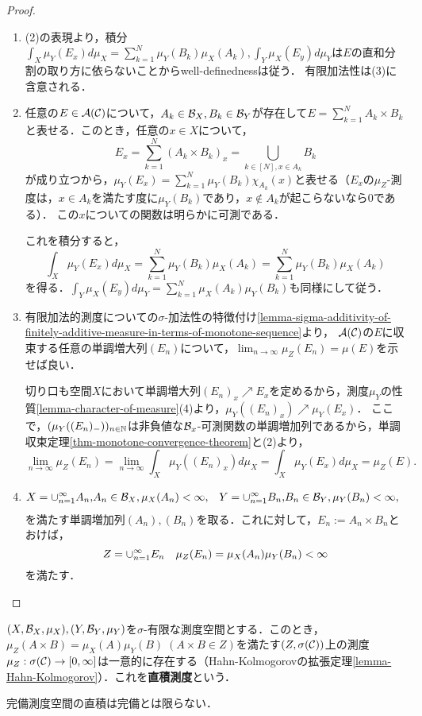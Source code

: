 \documentclass[uplatex, dvipdfmx]{jsreport}
\begin{document}
\begin{proof}\mbox{}
    \begin{enumerate}
        \item (2)の表現より，積分$\int_X\mu_Y(E_x)d\mu_X=\sum_{k=1}^N\mu_Y(B_k)\mu_X(A_k),\int_Y\mu_X(E_y)d\mu_Y$は$E$の直和分割の取り方に依らないことからwell-definednessは従う．
        有限加法性は(3)に含意される．
        \item 任意の$E\in\mathcal{A}(\mathcal{C})$について，$A_k\in\mathcal{B}_X,B_k\in\mathcal{B}_Y$が存在して$E=\sum_{k=1}^NA_k\times B_k$と表せる．このとき，任意の$x\in X$について，
        \[E_x=\sum^N_{k=1}(A_k\times B_k)_x=\bigcup_{k\in[N],x\in A_k}B_k\]
        が成り立つから，$\mu_Y(E_x)=\sum_{k=1}^N\mu_Y(B_k)\chi_{A_k}(x)$と表せる（$E_x$の$\mu_Z$-測度は，$x\in A_k$を満たす度に$\mu_Y(B_k)$であり，$x\notin A_k$が起こらないなら$0$である）．
        この$x$についての関数は明らかに可測である．

        これを積分すると，
        \[\int_X\mu_Y(E_x)d\mu_X=\sum_{k=1}^N\mu_Y(B_k)\mu_X(A_k)=\sum_{k=1}^N\mu_Y(B_k)\mu_X(A_k)\]
        を得る．$\int_Y\mu_X(E_y)d\mu_Y=\sum_{k=1}^N\mu_X(A_k)\mu_Y(B_k)$も同様にして従う．
        \item 
        有限加法的測度についての$\sigma$-加法性の特徴付け\ref{lemma-sigma-additivity-of-finitely-additive-measure-in-terms-of-monotone-sequence}より，
        $\mathcal{A}(\mathcal{C})$の$E$に収束する任意の単調増大列$(E_n)$について，$\lim_{n\to\infty}\mu_Z(E_n)=\mu(E)$を示せば良い．

        切り口も空間$X$において単調増大列$(E_n)_x\nearrow E_x$を定めるから，測度$\mu_Y$の性質\ref{lemma-character-of-measure}(4)より，$\mu_Y((E_n)_x)\nearrow\mu_Y(E_x)$．
        ここで，$(\mu_Y((E_n)_-))_{n\in\mathbb{N}}$は非負値な$\mathcal{B}_x$-可測関数の単調増加列であるから，単調収束定理\ref{thm-monotone-convergence-theorem}と(2)より，
        \[\lim_{n\to\infty}\mu_Z(E_n)=\lim_{n\to\infty}\int_X\mu_Y((E_n)_x)d\mu_X=\int_X\mu_Y(E_x)d\mu_X=\mu_Z(E).\]
        \item 
        \begin{align*}
            X=\cup_{n=1}^\infty A_n,&A_n\in\mathcal{B}_X,\mu_X(A_n)<\infty,&Y=\cup_{n=1}^\infty B_n,&B_n\in\mathcal{B}_Y,\mu_Y(B_n)<\infty,
        \end{align*}
        を満たす単調増加列$(A_n),(B_n)$を取る．これに対して，$E_n:=A_n\times B_n$とおけば，
        \[Z=\cup_{n=1}^\infty E_n\quad\mu_Z(E_n)=\mu_X(A_n)\mu_Y(B_n)<\infty\]
        を満たす．
    \end{enumerate}
\end{proof}

\begin{definition}
    $(X,\mathcal{B}_X,\mu_X),(Y,\mathcal{B}_Y,\mu_Y)$を$\sigma$-有限な測度空間とする．このとき，$\mu_Z(A\times B)=\mu_X(A)\mu_Y(B)\;(A\times B\in Z)$を満たす$(Z,\sigma(\mathcal{C}))$上の測度$\mu_Z:\sigma(\mathcal{C})\to[0,\infty]$は一意的に存在する（Hahn-Kolmogorovの拡張定理\ref{lemma-Hahn-Kolmogorov}）．これを\textbf{直積測度}という．
\end{definition}
\begin{remark}
    完備測度空間の直積は完備とは限らない．
\end{remark}
\end{document}
